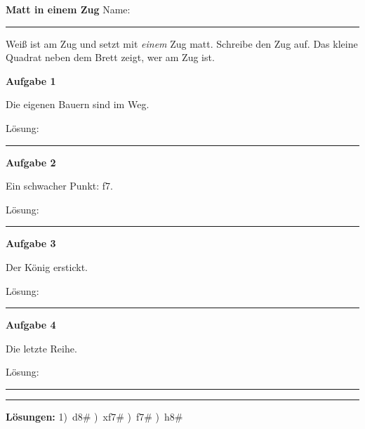 \documentclass[11pt,a4paper]{article}
\newcommand\Aufgabe[3]{%
  \begin{minipage}[t]{0.48\textwidth}\centering
    \textbf{Aufgabe #1}\par\smallskip
    \chessboard[setfen={#2}]\par\smallskip
    {\small #3}\par\smallskip
    Lösung: \rule{3cm}{0.4pt}
  \end{minipage}}
\begin{document}
{\Large\bfseries\sffamily Matt in einem Zug} \hfill Name: \rule{5cm}{0.4pt}

\smallskip
Weiß ist am Zug und setzt mit \emph{einem} Zug matt. Schreibe den Zug auf.
Das kleine Quadrat neben dem Brett zeigt, wer am Zug ist.

\bigskip
\Aufgabe{1}{6k1/5ppp/8/8/8/8/5PPP/3R2K1 w - - 0 1}{Die eigenen Bauern sind im Weg.}\hfill
\Aufgabe{2}{r1bqkbnr/pppp1ppp/2n5/4p3/2B1P3/5Q2/PPPP1PPP/RNB1K1NR w KQkq - 4 4}{Ein schwacher Punkt: f7.}

\bigskip\bigskip
\Aufgabe{3}{6rk/6pp/8/6N1/8/8/8/6K1 w - - 0 1}{Der König erstickt.}\hfill
\Aufgabe{4}{1k6/ppp5/8/8/8/8/8/K6R w - - 0 1}{Die letzte Reihe.}

\vfill
\rule{\textwidth}{0.4pt}\par
{\small\textbf{Lösungen:}
1)~\symrook d8\# )~\symqueen xf7\# )~\symknight f7\# )~\symrook h8\#}
\end{document}
